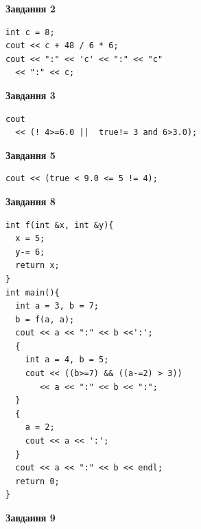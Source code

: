 \documentclass[12pt, ukrainian]{article}
\begin{document}
{\begin {large}
\begin{minipage}[t]{7.0cm}
\end{minipage}
\vline \hspace{1mm}
\begin{minipage}[t]{11.0cm}

\begin{center}
\textbf{Завдання 2}
\end{center}
\vspace{-8mm}

\begin{verbatim}
int c = 8;
cout << c + 48 / 6 * 6;
cout << ":" << 'c' << ":" << "c" 
  << ":" << c;
\end{verbatim}



\begin{center}
\textbf{Завдання 3}
\end{center}
\vspace{-8mm}

\begin{verbatim}
cout 
  << (! 4>=6.0 ||  true!= 3 and 6>3.0);
\end{verbatim}



\begin{center}
\textbf{Завдання 5}
\end{center}
\vspace{-8mm}

\begin{verbatim}
cout << (true < 9.0 <= 5 != 4);
\end{verbatim}



\begin{center}
\textbf{Завдання 8}
\end{center}
\vspace{-8mm}

\begin{verbatim}
int f(int &x, int &y){
  x = 5;
  y-= 6;
  return x;
}
int main(){
  int a = 3, b = 7;
  b = f(a, a);
  cout << a << ":" << b <<':';
  {
    int a = 4, b = 5;
    cout << ((b>=7) && ((a-=2) > 3))
       << a << ":" << b << ":";
  }
  {
    a = 2;
    cout << a << ':';
  }
  cout << a << ":" << b << endl;
  return 0;
}
\end{verbatim}

\end{minipage}


\begin{minipage}[t]{7.0cm}

\begin{center}
\textbf{Завдання 9}
\end{center}
\vspace{-8mm}


\end{minipage}
\end{large}}
\end{document}
